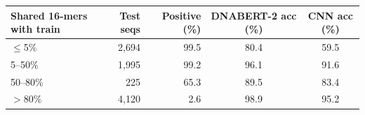 \begin{tabular}{lrrcc}
\toprule
Shared 16-mers with train & Test seqs & Positive (\%) & DNABERT-2 acc (\%) & CNN acc (\%) \\
\midrule
$\leq$5\% & 2,694 & 99.5 & 80.4 & 59.5 \\
5--50\% & 1,995 & 99.2 & 96.1 & 91.6 \\
50--80\% & 225 & 65.3 & 89.5 & 83.4 \\
$>$80\% & 4,120 & 2.6 & 98.9 & 95.2 \\
\bottomrule
\end{tabular}
